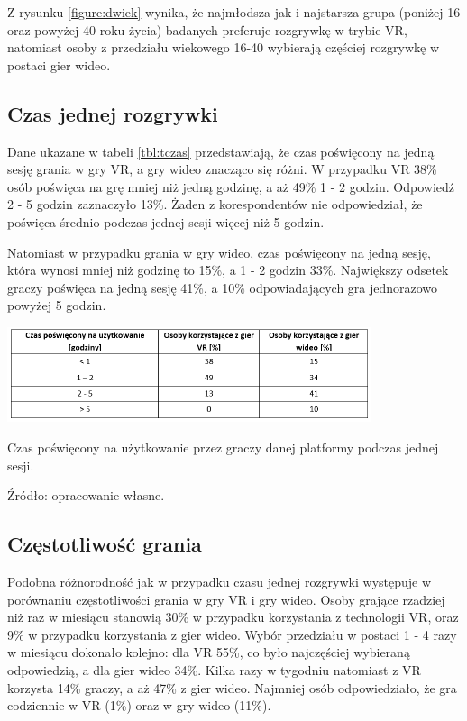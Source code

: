 Z rysunku \ref{figure:dwiek}  wynika, że najmłodsza jak i najstarsza grupa (poniżej 16 oraz powyżej 40 roku życia) badanych preferuje rozgrywkę w trybie VR, natomiast osoby z przedziału wiekowego 16-40 wybierają częściej rozgrywkę w postaci gier wideo. 

\subsection{Czas jednej rozgrywki}

Dane ukazane w tabeli \ref{tbl:tczas} przedstawiają, że czas poświęcony na jedną sesję grania w gry VR, a gry wideo znacząco się różni. W przypadku VR 38\% osób poświęca na grę mniej niż jedną godzinę, a aż 49\% 1 - 2 godzin. Odpowiedź 2 - 5 godzin zaznaczyło 13\%. Żaden z korespondentów nie odpowiedział, że poświęca średnio podczas jednej sesji więcej niż 5 godzin.

Natomiast w przypadku grania w gry wideo, czas poświęcony na jedną sesję, która wynosi mniej niż godzinę to 15\%, a 1 - 2 godzin 33\%. Największy odsetek graczy poświęca na jedną sesję 41\%, a 10\% odpowiadających gra jednorazowo powyżej 5 godzin. 

\clearpage

\begin{table}[htb]
  \centering
  \includegraphics[width=0.8\textwidth]{images/tczas.PNG}
  \caption{Czas poświęcony na użytkowanie przez graczy danej platformy podczas jednej sesji.}
  \caption*{Źródło: opracowanie własne.}
  \label{tbl:tczas}
\end{table}

\subsection{Częstotliwość grania}

Podobna różnorodność jak w przypadku czasu jednej rozgrywki występuje w porównaniu częstotliwości grania w gry VR i gry wideo. Osoby grające rzadziej niż raz w miesiącu stanowią 30\% w przypadku korzystania z technologii VR, oraz 9\% w przypadku korzystania z gier wideo. Wybór przedziału w postaci 1 - 4 razy w miesiącu dokonało kolejno: dla VR 55\%, co było najczęściej wybieraną odpowiedzią, a dla gier wideo 34\%. Kilka razy w tygodniu natomiast z VR korzysta 14\% graczy, a aż 47\% z gier wideo. Najmniej osób odpowiedziało, że gra codziennie w VR (1\%) oraz w gry wideo (11\%).

